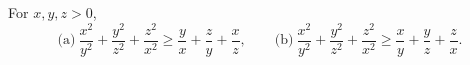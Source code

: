 For $x, y, z > 0$,
\[ \text{(a)}\ \frac{x^2}{y^2} + \frac{y^2}{z^2} + \frac{z^2}{x^2} \geq \frac{y}{x} + \frac{z}{y} + \frac{x}{z},\qquad \text{(b)}\ \frac{x^2}{y^2} + \frac{y^2}{z^2} + \frac{z^2}{x^2} \geq \frac{x}{y} + \frac{y}{z} + \frac{z}{x}. \]
